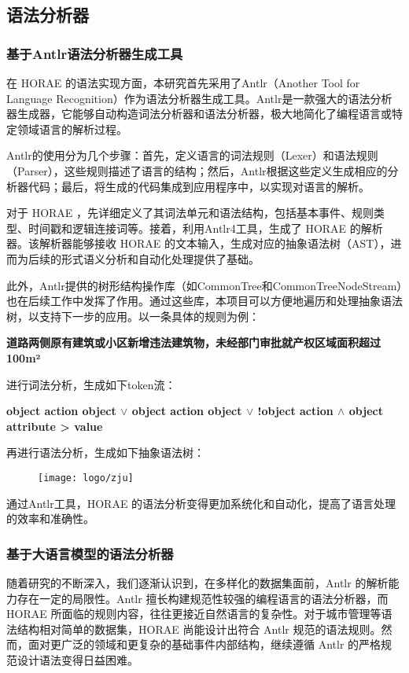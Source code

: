 \subsection{语法分析器}

\subsubsection{基于Antlr语法分析器生成工具}

在 HORAE 的语法实现方面，本研究首先采用了Antlr（Another Tool for Language Recognition）作为语法分析器生成工具。Antlr是一款强大的语法分析器生成器，它能够自动构造词法分析器和语法分析器，极大地简化了编程语言或特定领域语言的解析过程。

Antlr的使用分为几个步骤：首先，定义语言的词法规则（Lexer）和语法规则（Parser），这些规则描述了语言的结构；然后，Antlr根据这些定义生成相应的分析器代码；最后，将生成的代码集成到应用程序中，以实现对语言的解析。

对于 HORAE ，先详细定义了其词法单元和语法结构，包括基本事件、规则类型、时间戳和逻辑连接词等。接着，利用Antlr4工具，生成了 HORAE 的解析器。该解析器能够接收 HORAE 的文本输入，生成对应的抽象语法树（AST），进而为后续的形式语义分析和自动化处理提供了基础。

此外，Antlr提供的树形结构操作库（如CommonTree和CommonTreeNodeStream）也在后续工作中发挥了作用。通过这些库，本项目可以方便地遍历和处理抽象语法树，以支持下一步的应用。以一条具体的规则为例：

\textbf{道路两侧原有建筑或小区新增违法建筑物，未经部门审批就产权区域面积超过100m²}

进行词法分析，生成如下token流：

\textbf{object action object $\lor$ object action object $\lor$ !object action $\land$ object attribute > value}


再进行语法分析，生成如下抽象语法树：

\begin{figure}[ht]
    \centering
    \texttt{[image: logo/zju]}
\end{figure}

通过Antlr工具，HORAE 的语法分析变得更加系统化和自动化，提高了语言处理的效率和准确性。

\subsubsection{基于大语言模型的语法分析器}

随着研究的不断深入，我们逐渐认识到，在多样化的数据集面前，Antlr 的解析能力存在一定的局限性。Antlr 擅长构建规范性较强的编程语言的语法分析器，而 HORAE 所面临的规则内容，往往更接近自然语言的复杂性。对于城市管理等语法结构相对简单的数据集，HORAE 尚能设计出符合 Antlr 规范的语法规则。然而，面对更广泛的领域和更复杂的基础事件内部结构，继续遵循 Antlr 的严格规范设计语法变得日益困难。

